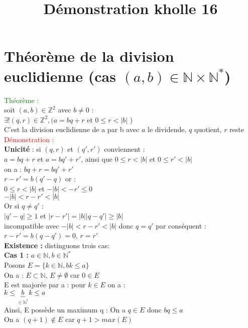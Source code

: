 \documentclass{article}
\begin{document}
\title{Démonstration kholle 16}
\date{}
\maketitle
	\renewcommand{\thesection}{\Roman{section}}
	\setlength{\parindent}{1.5cm}
\section{Théorème de la division euclidienne (cas $(a,b) \in \mathbb{N} \times \mathbb{N}^\ast$)}
\textcolor{green}{Théorème :} \\ 
soit $(a,b) \in \mathbb{Z}^2$ avec $b \neq 0$ : \\ 
$\exists ! (q,r) \in \mathbb{Z}^2,(a=bq+r$ et $0 \leq r <|b|$ ) \\ 
C'est la division euclidienne de a par b  avec $a$ le dividende, $q$ quotient, $r$ reste \\
\textcolor{red}{Démonstration :} \\  
{\bf Unicité} : si $(q,r)$ et $(q',r')$ conviennent : \\ 
$a=bq+r$ et $a=bq'+r'$, ainsi que $0\leq r < |b|$ et $0 \leq r' < |b|$ \\ 
on a : $bq+r=bq'+r'$ \\ 
$r-r'=b(q'-q)$ or : \\ 
$0 \leq r < |b|$ et $-|b| < -r' \leq 0$ \\ 
$-|b| < r-r' < |b|$ \\ 
Or si $q \neq q'$ : \\ 
$|q'-q| \geq 1$ et $|r-r'|=|b||q-q'|\geq |b|$ \\ 
incompatible avec $-|b| < r-r' < |b|$ donc $q=q'$ par conséquent : \\ 
$r-r'=b(q-q')=0$, $r=r'$ \\ 
{\bf Existence :} distinguons trois cas: \\ 
{\bf Cas 1 :} $a \in \mathbb{N}, b \in \mathbb{N}^\ast$ \\ 
Posons $E= \lbrace k \in \mathbb{N}, bk \leq a\rbrace$ \\ 
On a : $E \subset \mathbb{N}$, $E \neq \emptyset$ car $0 \in E $ \\ 
E est majorée par a : pour $k \in E$ on a : \\ 
$k \leq \underbrace{b}_{\in \mathbb{N}^\ast} k \leq a$ \\ 
Ainsi, E possède un maximum q : On a $q \in E$ donc $bq \leq a$ \\ 
On a $(q+1) \notin E$ car $q+1>max(E)$ \\ 
\end{document}
